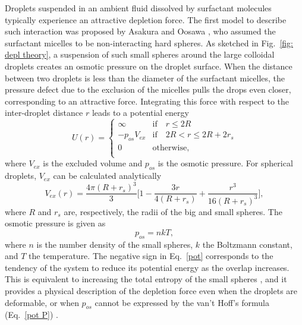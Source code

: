 Droplets suspended in an ambient fluid dissolved by surfactant molecules typically experience an attractive depletion force. The first model to describe such interaction was proposed by Asakura and Oosawa \cite{Asakura_Oosawa}, who assumed the surfactant micelles to be non-interacting hard spheres. As sketched in Fig.\ \ref{fig: depl theory}, a suspension of such small spheres around the large colloidal droplets creates an osmotic pressure on the droplet surface. When the distance between two droplets is less than the diameter of the surfactant micelles, the pressure defect due to the exclusion of the micelles pulls the drops even closer, corresponding to an attractive force. Integrating this force with respect to the inter-droplet distance $r$ leads to a potential energy
\begin{equation}
    U(r)=
    \begin{cases}
        \infty & \textrm{if} \quad r \leqslant 2R \\
        - p_{os}V_{ex} & \textrm{if} \quad 2R < r \leqslant 2R+2r_s  \\
        0 \quad & \textrm{otherwise}, \\
    \end{cases}
    \label{pot}
\end{equation}
where $V_{ex}$ is the excluded volume and $p_{os}$ is the osmotic pressure. For spherical droplets, $V_{ex}$ can be calculated analytically
\begin{equation}
    V_{ex}(r) = \frac{4\pi (R+r_s)^3}{3}\bigg[ 1- \frac{3r}{4(R+r_s)}+\frac{r^3}{16(R+r_s)^3} \bigg],
    \label{pot V}
\end{equation}
where $R$ and $r_s$ are, respectively, the radii of the big and small spheres. The osmotic pressure is given as
\begin{equation}
    p_{os} = nkT,
    \label{pot P}
\end{equation}
where $n$ is the number density of the small spheres, $k$ the Boltzmann constant, and $T$ the temperature. The negative sign in Eq.\ \eqref{pot} corresponds to the tendency of the system to reduce its potential energy as the overlap increases. This is equivalent to increasing the total entropy of the small spheres \cite{Melby_PRL_2007}, and it provides a physical description of the depletion force even when the droplets are deformable, or when $p_{os}$ cannot be expressed by the van't Hoff's formula (Eq.\ \eqref{pot P}) \cite{Asakura_Oosawa}.

